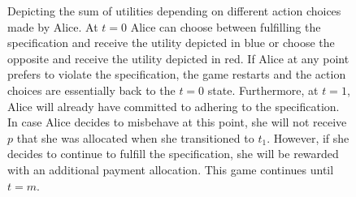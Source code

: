 \begin{figure}[h!]
    \centering
    \caption{Depicting the sum of utilities depending on different action choices made by Alice. At $t=0$ Alice can choose between fulfilling the specification and receive the utility depicted in blue or choose the opposite and receive the utility depicted in red. If Alice at any point prefers to violate the specification, the game restarts and the action choices are essentially back to the $t=0$ state. Furthermore, at $t=1$, Alice will already have committed to adhering to the specification. In case Alice decides to misbehave at this point, she will not receive $p$ that she was allocated when she transitioned to $t_1$. However, if she decides to continue to fulfill the specification, she will be rewarded with an additional payment allocation. This game continues until $t=m$.}
    \label{fig:payoffstree}
\end{figure}